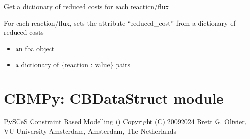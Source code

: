 \documentclass[letterpaper,10pt,english]{sphinxmanual}
\begin{document}

\begin{fulllineitems}
\label{\detokenize{modules_doc:cbmpy.CBCPLEX.getReducedCosts}}
\pysigstartsignatures
{}
\pysigstopsignatures
\sphinxAtStartPar
Get a dictionary of reduced costs for each reaction/flux

\end{fulllineitems}


\begin{fulllineitems}
\label{\detokenize{modules_doc:cbmpy.CBCPLEX.setReducedCosts}}
\pysigstartsignatures
{}
\pysigstopsignatures
\sphinxAtStartPar
For each reaction/flux, sets the attribute “reduced\_cost” from a dictionary of
reduced costs
\begin{itemize}
\item {} 
\sphinxAtStartPar
{} an fba object

\item {} 
\sphinxAtStartPar
{} a dictionary of \{reaction : value\} pairs

\end{itemize}

\end{fulllineitems}

\label{\detokenize{modules_doc:module-cbmpy.CBDataStruct}}

\section{CBMPy: CBDataStruct module}
\label{\detokenize{modules_doc:cbmpy-cbdatastruct-module}}
\sphinxAtStartPar
PySCeS Constraint Based Modelling ()
Copyright (C) 2009\sphinxhyphen{}2024 Brett G. Olivier, VU University Amsterdam, Amsterdam, The Netherlands
\end{document}
